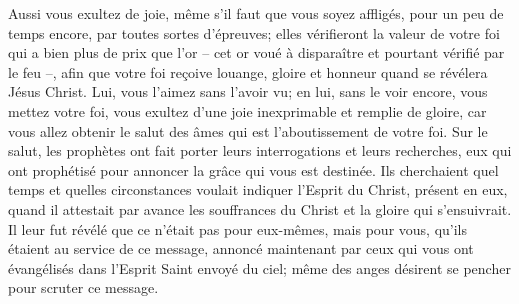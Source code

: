 Aussi vous exultez de joie,
	même s’il faut que vous soyez affligés, pour un peu de temps encore,
	par toutes sortes d’épreuves;
	elles vérifieront la valeur de votre foi qui a bien plus de prix que l’or
	– cet or voué à disparaître et pourtant vérifié par le feu –,
	afin que votre foi reçoive louange, gloire et honneur
	quand se révélera Jésus Christ.
Lui, vous l’aimez sans l’avoir vu;
	en lui, sans le voir encore, vous mettez votre foi,
	vous exultez d’une joie inexprimable et remplie de gloire,
	car vous allez obtenir le salut des âmes
	qui est l’aboutissement de votre foi.
Sur le salut,
		les prophètes ont fait porter leurs interrogations et leurs recherches,
	eux qui ont prophétisé pour annoncer la grâce qui vous est destinée.
Ils cherchaient quel temps et quelles circonstances
		voulait indiquer l’Esprit du Christ, présent en eux,
	quand il attestait par avance les souffrances du Christ
	et la gloire qui s’ensuivrait.
Il leur fut révélé que ce n’était pas pour eux-mêmes, mais pour vous,
	qu’ils étaient au service de ce message,
	annoncé maintenant par ceux qui vous ont évangélisés
		dans l’Esprit Saint envoyé du ciel;
	même des anges désirent se pencher pour scruter ce message.
